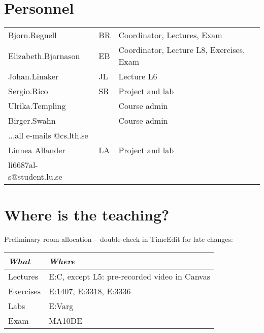 \section{Personnel}
\begin{flushleft}
	\setlength{\tabcolsep}{0pt}
	\begin{tabular}{p{} p{} p{}}
		Bjorn.Regnell & BR & Coordinator, Lectures, Exam \\
		Elizabeth.Bjarnason & EB & Coordinator, Lecture L8, Exercises, Exam \\
		Johan.Linaker & JL & Lecture L6\\
		Sergio.Rico & SR & Project and lab \\
		Ulrika.Templing & & Course admin \\
		Birger.Swahn & & Course admin \\
		...all e-mails @cs.lth.se\\
		Linnea Allander & LA & Project and lab \\
		li6687al-s@student.lu.se\\
	\end{tabular}
\end{flushleft}

\section{Where is the teaching?}

\noindent Preliminary room allocation -- double-check in TimeEdit for late changes:
\begin{flushleft}
\small
\begin{tabular}{l | l } 
{\it What} & {\it Where} \\
\hline
Lectures & E:C, except L5: pre-recorded video in Canvas  
\\
Exercises & E:1407, E:3318, E:3336 %
\\
Labs & E:Varg %
\\
Exam & MA10DE\\
\end{tabular}
\end{flushleft}

